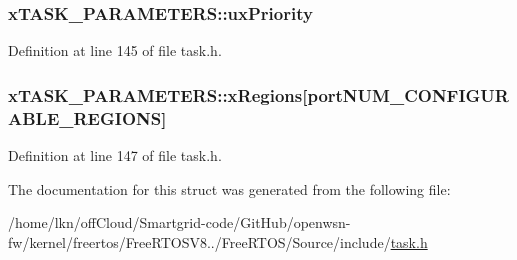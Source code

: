 \subsubsection[{\texorpdfstring{ux\+Priority}{uxPriority}}]{ x\+T\+A\+S\+K\+\_\+\+P\+A\+R\+A\+M\+E\+T\+E\+R\+S\+::ux\+Priority}\hypertarget{structx_t_a_s_k___p_a_r_a_m_e_t_e_r_s_aa1aff14035db645e2bdcc85b3cdc9bab}{}\label{structx_t_a_s_k___p_a_r_a_m_e_t_e_r_s_aa1aff14035db645e2bdcc85b3cdc9bab}


Definition at line 145 of file task.\+h.

\subsubsection[{\texorpdfstring{x\+Regions}{xRegions}}]{ x\+T\+A\+S\+K\+\_\+\+P\+A\+R\+A\+M\+E\+T\+E\+R\+S\+::x\+Regions\mbox{[}{\bf port\+N\+U\+M\+\_\+\+C\+O\+N\+F\+I\+G\+U\+R\+A\+B\+L\+E\+\_\+\+R\+E\+G\+I\+O\+NS}\mbox{]}}\hypertarget{structx_t_a_s_k___p_a_r_a_m_e_t_e_r_s_ae8b97c6b7a344bf09b066b0844844d66}{}\label{structx_t_a_s_k___p_a_r_a_m_e_t_e_r_s_ae8b97c6b7a344bf09b066b0844844d66}


Definition at line 147 of file task.\+h.



The documentation for this struct was generated from the following file\+:\begin{DoxyCompactItemize}
\item 
/home/lkn/off\+Cloud/\+Smartgrid-\/code/\+Git\+Hub/openwsn-\/fw/kernel/freertos/\+Free\+R\+T\+O\+S\+V8../\+Free\+R\+T\+O\+S/\+Source/include/\hyperlink{task_8h}{task.\+h}\end{DoxyCompactItemize}
